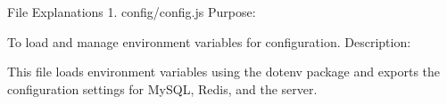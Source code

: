 File Explanations
1. config/config.js
Purpose:

To load and manage environment variables for configuration.
Description:

This file loads environment variables using the dotenv package and exports the configuration settings for MySQL, Redis, and the server.
